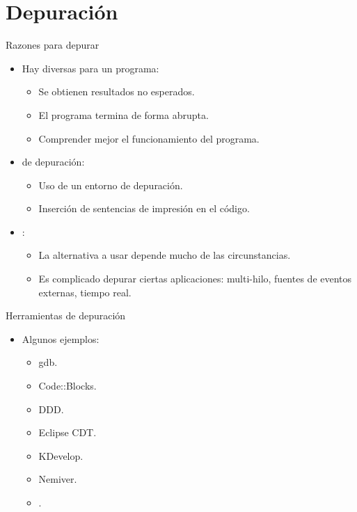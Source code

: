 \section{Depuración}

\begin{frame}[t]{Razones para depurar}
\begin{itemize}
  \item Hay diversas  para  un programa:
    \begin{itemize}
      \item Se obtienen resultados no esperados.
      \item El programa termina de forma abrupta.
      \item Comprender mejor el funcionamiento del programa.
    \end{itemize}

  \item {} de depuración:
    \begin{itemize}
      \item Uso de un entorno de depuración.
      \item Inserción de sentencias de impresión en el código.
    \end{itemize}

  \item {}:
    \begin{itemize}
      \item La alternativa a usar depende mucho de las circunstancias.
      \item Es complicado depurar ciertas aplicaciones: 
            multi-hilo, fuentes de eventos externas, tiempo real.
    \end{itemize}
\end{itemize}
\end{frame}

\begin{frame}[t]{Herramientas de depuración}
\begin{itemize}
  \item Algunos ejemplos:
    \begin{itemize}
      \item gdb.
      \item Code::Blocks.
      \item DDD.
      \item Eclipse CDT.
      \item KDevelop.
      \item Nemiver.
      \item {}.
    \end{itemize}
\end{itemize}
\end{frame}
